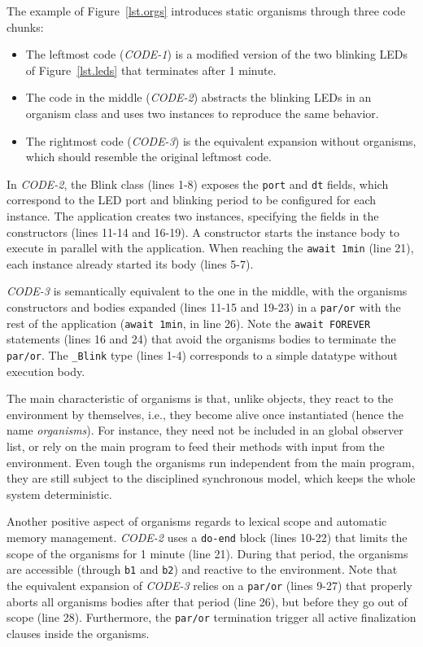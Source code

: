\documentclass{acm_proc_article-sp}
\newcommand{\CEU}{\textsc{C\'{e}u}\xspace}
\newcommand{\code}[1] {{\small{\texttt{#1}}}}
\newcommand{\1}{\;}
\newcommand{\2}{\;\;}
\newcommand{\3}{\;\;\;}
\newcommand{\5}{\;\;\;\;\;}
\begin{document}
The example of Figure~\ref{lst.orgs} introduces static organisms through three 
code chunks:
%
\begin{itemize}
\item The leftmost code (\emph{CODE-1}) is a modified version of the two 
blinking LEDs of Figure~\ref{lst.leds} that terminates after 1 minute.
%
\item The code in the middle (\emph{CODE-2}) abstracts the blinking LEDs in an 
organism class and uses two instances to reproduce the same behavior.
%
\item The rightmost code (\emph{CODE-3}) is the equivalent expansion without 
organisms, which should resemble the original leftmost code.
\end{itemize}
%
In \emph{CODE-2}, the Blink class (lines 1-8) exposes the \code{port} and 
\code{dt} fields, which correspond to the LED port and blinking period to be 
configured for each instance.
The application creates two instances, specifying the fields in the 
constructors (lines 11-14 and 16-19).
A constructor starts the instance body to execute in parallel with the 
application.
When reaching the \code{await 1min} (line 21), each instance already started 
its body (lines 5-7).

\emph{CODE-3} is semantically equivalent to the one in the middle, with the 
organisms constructors and bodies expanded (lines 11-15 and 19-23) in a 
\code{par/or} with the rest of the application (\code{await 1min}, in line 26).  
Note the \code{await FOREVER} statements (lines 16 and 24) that avoid the 
organisms bodies to terminate the \code{par/or}.
The \code{\_Blink} type (lines 1-4) corresponds to a simple datatype without 
execution body.

The main characteristic of organisms is that, unlike objects, they react to the 
environment by themselves, i.e., they become alive once instantiated (hence the 
name \emph{organisms}).
%
For instance, they need not be included in an global observer list, or rely on 
the main program to feed their methods with input from the environment.
%
Even tough the organisms run independent from the main program, they are still 
subject to the disciplined synchronous model, which keeps the whole system 
deterministic.
%

Another positive aspect of organisms regards to lexical scope and automatic 
memory management.
%
\emph{CODE-2} uses a \code{do-end} block (lines 10-22) that limits the scope of 
the organisms for 1 minute (line 21).
%
During that period, the organisms are accessible (through \code{b1} and 
\code{b2}) and reactive to the environment.
%
Note that the equivalent expansion of \emph{CODE-3} relies on a \code{par/or} 
(lines 9-27) that properly aborts all organisms bodies after that period (line 
26), but before they go out of scope (line 28).
%
Furthermore, the \code{par/or} termination trigger all active finalization 
clauses inside the organisms.
\end{document}
